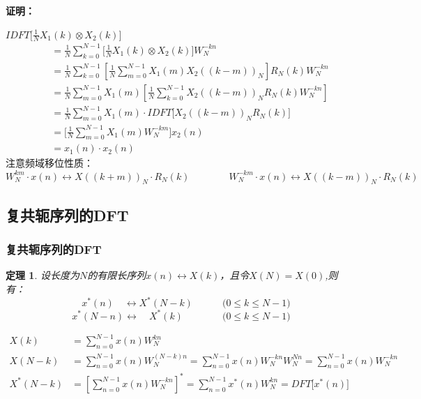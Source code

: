 \documentclass[notheorems,compress,mathserif,table]{beamer}
\newtheorem{theorem}{定理}
\begin{document}
\begin{frame}[shrink]\frametitle{}%
\textbf{证明：}

$IDFT\big[ \frac{1}{N}X_1(k) \otimes X_2(k)\big]$
\begin{equation*}
\begin{split}
    \quad
         &= \frac{1}{N}\sum_{k=0}^{N-1}\bigg[ \frac{1}{N}X_1(k) \otimes X_2(k) \bigg]W_N^{-kn} \\
         &= \frac{1}{N}\sum_{k=0}^{N-1}\left[\frac{1}{N}\sum_{m=0}^{N-1}X_1(m) X_2((k-m))_N \right] R_N(k) W_N^{-kn}   \\
         &= \frac{1}{N}\sum_{m=0}^{N-1}X_1(m)\left[ \frac{1}{N}\sum_{k=0}^{N-1} X_2((k-m))_N R_N(k) W_N^{-kn} \right]   \\
         &= \frac{1}{N}\sum_{m=0}^{N-1}X_1(m)\cdot IDFT\Big[  X_2((k-m))_N R_N(k) \Big]  \quad \\
         &= \Big[\frac{1}{N}\sum_{m=0}^{N-1} X_1(m)W_N^{-km}\Big] x_2(n) \\
         &= x_1(n)\cdot x_2(n)
\end{split}
\end{equation*}
注意频域移位性质：
$$W_N^{km}\cdot x(n) \longleftrightarrow X((k+m))_N\cdot R_N(k)  \qquad\qquad
  W_N^{-km}\cdot x(n) \longleftrightarrow X((k-m))_N\cdot R_N(k) $$
\end{frame}
%
\subsection{复共轭序列的DFT}


\begin{frame}[shrink]\frametitle{复共轭序列的DFT}%
\begin{theorem}
设长度为$N$的有限长序列$x(n)\leftrightarrow X(k)$，且令$X(N)=X(0)$,则有：
$$\qquad x^*(n) \quad \longleftrightarrow  X^*(N-k) \qquad\quad \big(0\leq k\leq N-1\big) \quad$$
$$ x^*(N-n) \longleftrightarrow  \quad X^*(k) \qquad\qquad \big(0\leq k\leq N-1\big) $$
\end{theorem}
\begin{equation*}
\begin{split}
    X(k)     &= \sum_{n=0}^{N-1}x(n)W_N^{kn}    \\
    X(N-k)   &= \sum_{n=0}^{N-1}x(n)W_N^{(N-k)n}
              = \sum_{n=0}^{N-1}x(n)W_N^{-kn}W_N^{Nn}
              = \sum_{n=0}^{N-1}x(n)W_N^{-kn}       \\%
    X^*(N-k) &= \left[\sum_{n=0}^{N-1}x(n)W_N^{-kn}\right]^*  = \sum_{n=0}^{N-1}x^*(n)W_N^{kn} = DFT\big[x^*(n)\big]
\end{split}
\end{equation*}
\end{frame}
\end{document}
